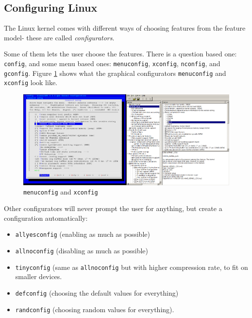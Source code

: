 \documentclass[a4paper,11pt]{report}
\newcommand{\figa}{
    \begin{figure}[!htpb]
    \centering
}
\newcommand{\figb}[2]{
    \caption{#1}
    \label{#2}
    \end{figure}
}
\begin{document}

            \subsection{Configuring Linux}
            \label{sec:conf}

The Linux kernel comes with different ways of choosing features from the feature model- these are 
called \emph{configurators}. 

Some of them lets the user choose the features. There is a question based 
one: \texttt{config}, and some menu based ones: \texttt{menuconfig}, 
\texttt{xconfig}, \texttt{nconfig}, and \texttt{gconfig}.  Figure \ref{fig:lineofconfigs} shows what the graphical 
configurators \texttt{menuconfig} and 
\texttt{xconfig} look like.
\\


\figa
    \includegraphics[scale=0.25]{pngs/2configs.png}
\figb{\texttt{menuconfig} and \texttt{xconfig}}{fig:lineofconfigs}

Other configurators will 
never prompt the user for anything, but create a configuration automatically: 
\begin{itemize}
    \item \texttt{allyesconfig} (enabling as much as possible) 
    \item \texttt{allnoconfig} (disabling as much as possible)
    \item \texttt{tinyconfig} (same as \texttt{allnoconfig} but with higher 
    compression rate, to fit on smaller devices.
    \item \texttt{defconfig} (choosing the default values for everything)
    \item \texttt{randconfig} (choosing random values for everything).
\end{itemize}
\end{document}
